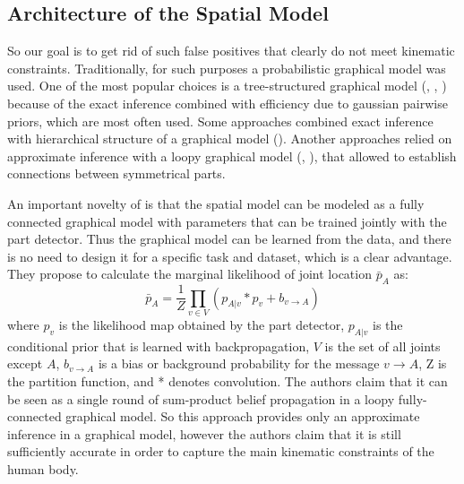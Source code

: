 \documentclass[a4paper,10pt]{article}
\begin{document}
	\subsection{Architecture of the Spatial Model}
	So our goal is to get rid of such false positives that clearly do not meet kinematic constraints. Traditionally, for such purposes a probabilistic graphical model was used. One of the most popular choices is a tree-structured graphical model (\cite{andriluka2009pictorial}, \cite{pishchulin2013strong}, \cite{pishchulin2013poselet}) because of the exact inference combined with efficiency due to gaussian pairwise priors, which are most often used. Some approaches combined exact inference with hierarchical structure of a graphical model (\cite{tian2012exploring}). Another approaches relied on approximate inference with a loopy graphical model (\cite{lan2005beyond}, \cite{karlinsky2012using}), that allowed to establish connections between symmetrical parts.
	
	An important novelty of \cite{cnn_pgm_for_hpe} is that the spatial model can be modeled as a fully connected graphical model with parameters that can be trained jointly with the part detector. Thus the graphical model can be learned from the data, and there is no need to design it for a specific task and dataset, which is a clear advantage. They propose to calculate the marginal likelihood of joint location $\bar{p}_A$ as:
	\begin{equation*}
		\bar{p}_A = \frac{1}{Z} \prod_{v \in V} (p_{A|v} * p_v + b_{v \rightarrow A})
	\end{equation*}
	where $p_v$ is the likelihood map obtained by the part detector, $p_{A|v}$ is the conditional prior that is learned with backpropagation, $V$ is the set of all joints except $A$, $b_{v \rightarrow A}$ is a bias or background probability for the message $v \rightarrow A$, Z is the partition function, and * denotes convolution. The authors claim that it can be seen as a single round of sum-product belief propagation in a loopy fully-connected graphical model. So this approach provides only an approximate inference in a graphical model, however the authors claim that it is still sufficiently accurate in order to capture the main kinematic constraints of the human body.
	
\end{document}
